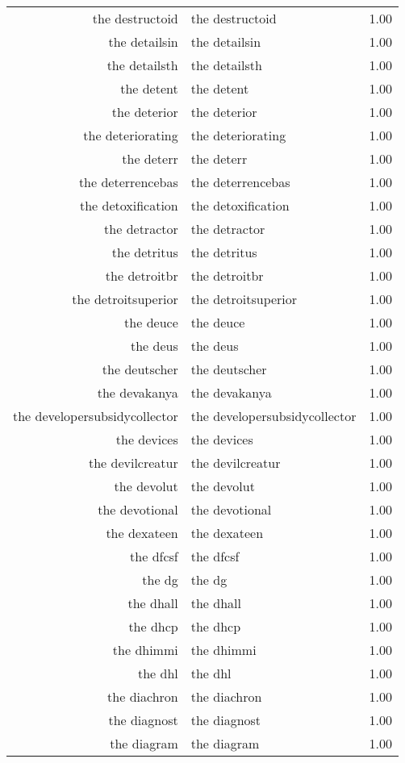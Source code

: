 \begin{table}[ht]
\begin{tabular}{rlr}
  the destructoid & the destructoid & 1.00 \\ 
  the detailsin & the detailsin & 1.00 \\ 
  the detailsth & the detailsth & 1.00 \\ 
  the detent & the detent & 1.00 \\ 
  the deterior & the deterior & 1.00 \\ 
  the deteriorating & the deteriorating & 1.00 \\ 
  the deterr & the deterr & 1.00 \\ 
  the deterrencebas & the deterrencebas & 1.00 \\ 
  the detoxification & the detoxification & 1.00 \\ 
  the detractor & the detractor & 1.00 \\ 
  the detritus & the detritus & 1.00 \\ 
  the detroitbr & the detroitbr & 1.00 \\ 
  the detroitsuperior & the detroitsuperior & 1.00 \\ 
  the deuce & the deuce & 1.00 \\ 
  the deus & the deus & 1.00 \\ 
  the deutscher & the deutscher & 1.00 \\ 
  the devakanya & the devakanya & 1.00 \\ 
  the developersubsidycollector & the developersubsidycollector & 1.00 \\ 
  the devices & the devices & 1.00 \\ 
  the devilcreatur & the devilcreatur & 1.00 \\ 
  the devolut & the devolut & 1.00 \\ 
  the devotional & the devotional & 1.00 \\ 
  the dexateen & the dexateen & 1.00 \\ 
  the dfcsf & the dfcsf & 1.00 \\ 
  the dg & the dg & 1.00 \\ 
  the dhall & the dhall & 1.00 \\ 
  the dhcp & the dhcp & 1.00 \\ 
  the dhimmi & the dhimmi & 1.00 \\ 
  the dhl & the dhl & 1.00 \\ 
  the diachron & the diachron & 1.00 \\ 
  the diagnost & the diagnost & 1.00 \\ 
  the diagram & the diagram & 1.00 \\ 

\end{tabular}
\end{table}
